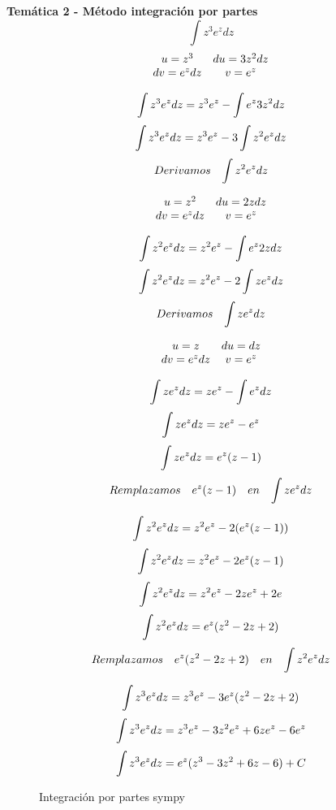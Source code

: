 




\textbf{Temática 2 - Método integración por partes}
\[\int z^3e^zdz\]
\[
    \begin{matrix}
        u=z^3 & du=3z^2dz \\
        dv=e^zdz & v=e^z
    \end{matrix}
\]

\drawpintegration
\[\int z^3 e^zdz=z^3 e^z-\int e^z 3z^2dz\]
\[\int z^3 e^zdz=z^3 e^z-3\int z^2e^zdz\]
\[
    \begin{aligned}
        Derivamos && \int z^2e^zdz
    \end{aligned}
\]

\[
    \begin{matrix}
        u=z^2 & du=2zdz \\
        dv=e^zdz & v=e^z
    \end{matrix}
\]

\drawpintegration
\[\int z^2 e^zdz=z^2 e^z-\int e^z 2zdz\]
\[\int z^2 e^zdz=z^2 e^z-2\int ze^zdz\]
\[
    \begin{aligned}
        Derivamos && \int ze^zdz
    \end{aligned}
\]

\[
    \begin{matrix}
        u=z & du=dz \\
        dv=e^zdz & v=e^z
    \end{matrix}
\]

\drawpintegration
\[\int z e^zdz=z e^z-\int e^z dz\]
\[\int z e^zdz=z e^z-e^z\]
\[\int z e^zdz=e^z(z-1)\]
\[
    \begin{aligned}
        Remplazamos && e^z(z-1) && en && \int ze^zdz
    \end{aligned}
\]

\[\int z^2 e^zdz=z^2 e^z-2(e^z(z-1))\]
\[\int z^2 e^zdz=z^2 e^z-2e^z(z-1)\]
\[\int z^2 e^zdz=z^2 e^z-2ze^z+2e\]
\[\int z^2 e^zdz=e^z(z^2-2z+2)\]
\[
    \begin{aligned}
        Remplazamos && e^z(z^2-2z+2) && en && \int z^2e^zdz
    \end{aligned}
\]

\[\int z^3 e^zdz=z^3 e^z-3e^z(z^2-2z+2)\]
\[\int z^3 e^zdz=z^3 e^z-3z^2e^z+6ze^z-6e^z\]
\[\int z^3 e^zdz=e^z(z^3-3z^2+6z-6)+C\]

\begin{figure}[h]
    \begin{center}
        \caption{Integración por partes sympy}
    \end{center}
\end{figure}